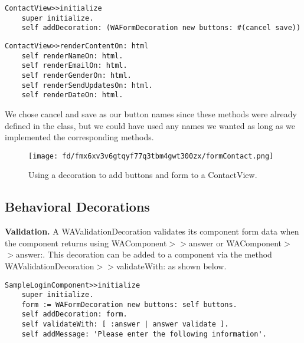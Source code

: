 \documentclass[a4paper,10pt,twoside]{book}
\newcommand{\ct}[1]{{\small\ttfamily\textup{#1}}}
\begin{document}
\begin{lstlisting}
ContactView>>initialize
    super initialize.
    self addDecoration: (WAFormDecoration new buttons: #(cancel save))
\end{lstlisting}

\begin{lstlisting}
ContactView>>renderContentOn: html
    self renderNameOn: html.
    self renderEmailOn: html.
    self renderGenderOn: html.
    self renderSendUpdatesOn: html.
    self renderDateOn: html.
\end{lstlisting}

We chose \ct{cancel} and \ct{save} as our button names since these methods were already defined in the class, but we could have used any names we wanted as long as we implemented the corresponding methods.

\begin{figure}[h!tbp]
	\begin{center}
		\texttt{[image: fd/fmx6xv3v6gtqyf77q3tbm4gwt300zx/formContact.png]}
		\caption{Using a decoration to add buttons and form to a ContactView.\label{book:components:embedding:decorations:visualdecorations:formcontact}}
	\end{center}
\end{figure}


\subsection{Behavioral Decorations}
\label{book:components:embedding:decorations:behavioraldecorations}

\textbf{Validation.} A  \ct{WAValidationDecoration} validates its component form data when the component returns using \ct{WAComponent$>$$>$answer} or \ct{WAComponent$>$$>$answer:}. This decoration can be added to a component via the method \ct{WAValidationDecoration$>$$>$validateWith:} as shown below.

\begin{lstlisting}
SampleLoginComponent>>initialize
    super initialize.
    form := WAFormDecoration new buttons: self buttons.
    self addDecoration: form.
    self validateWith: [ :answer | answer validate ].
    self addMessage: 'Please enter the following information'.
\end{lstlisting}
\end{document}
